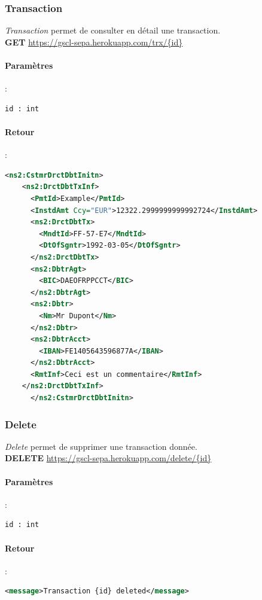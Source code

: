 \documentclass{article}
\begin{document}
      \subsubsection{Transaction}
	\emph{Transaction} permet de consulter en détail une transaction.\\
	\textbf{GET} \url{https://gscl-sepa.herokuapp.com/trx/{id}}
	\paragraph{Paramètres}:
	  \begin{lstlisting}[language=xml]
      id : int
	  \end{lstlisting}
	\paragraph{Retour}:
	  \begin{lstlisting}[language=xml]
      <ns2:CstmrDrctDbtInitn>
	<ns2:DrctDbtTxInf>
	  <PmtId>Example</PmtId>
	  <InstdAmt Ccy="EUR">12322.2999999999992724</InstdAmt>
	  <ns2:DrctDbtTx>
	    <MndtId>FF-57-E7</MndtId>
	    <DtOfSgntr>1992-03-05</DtOfSgntr>
	  </ns2:DrctDbtTx>
	  <ns2:DbtrAgt>
	    <BIC>DAEOFRPPCCT</BIC>
	  </ns2:DbtrAgt>
	  <ns2:Dbtr>
	    <Nm>Mr Dupont</Nm>
	  </ns2:Dbtr>
	  <ns2:DbtrAcct>
	    <IBAN>FE1405643596877A</IBAN>
	  </ns2:DbtrAcct>
	  <RmtInf>Ceci est un commentaire</RmtInf>
	</ns2:DrctDbtTxInf>
      </ns2:CstmrDrctDbtInitn>
	  \end{lstlisting}
	  
      \subsubsection{Delete}
	\emph{Delete} permet de supprimer une transaction donnée. \\
	\textbf{DELETE} \url{https://gscl-sepa.herokuapp.com/delete/{id}}
	\paragraph{Paramètres}:
	  \begin{lstlisting}[language=xml]
      id : int
	  \end{lstlisting}
	\paragraph{Retour}:
	  \begin{lstlisting}[language=xml]
      <message>Transaction {id} deleted</message>
	  \end{lstlisting}
    
\end{document}
